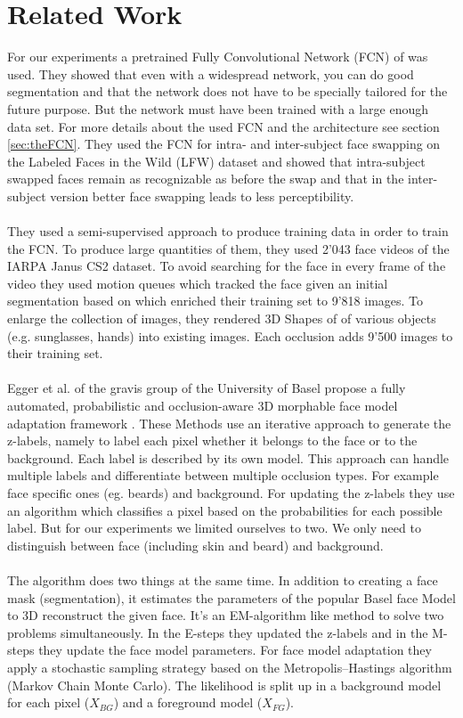 \section{Related Work}
For our experiments a pretrained Fully Convolutional Network (FCN) of \cite{nirkin2018_faceswap} was used. They showed that even with a widespread network, you can do good segmentation and that the network does not have to be specially tailored for the future purpose. But the network must have been trained with a large enough data set. For more details about the used FCN and the architecture see section \ref{sec:theFCN}. They used the FCN for intra- and inter-subject face swapping on the Labeled Faces in the Wild (LFW) dataset and showed that intra-subject swapped faces remain as recognizable as before the swap and that in the inter-subject version better face swapping  leads to less perceptibility.\\
\\
They used a semi-supervised approach to produce training data in order to train the FCN. To produce large quantities of them, they used 2'043 face videos of the IARPA Janus CS2 dataset. To avoid searching for the face in every frame of the video they used motion queues which tracked the face given an initial segmentation based on \cite{grundmann} which enriched their training set to 9'818 images. To enlarge the collection of images, they rendered 3D Shapes of of various objects (e.g. sunglasses, hands) into existing images. Each occlusion adds 9'500 images to their training set.\\
\\
Egger et al. of the gravis group of the University of Basel propose a fully automated, probabilistic and occlusion-aware 3D morphable face model adaptation framework \cite{egger_paper}. These Methods use an iterative approach to generate the z-labels, namely to label each pixel whether it belongs to the face or to the background. Each label is described by its own model. This approach can handle multiple labels and differentiate between multiple occlusion types. For example face specific ones (eg. beards) and background. For updating the z-labels they use an algorithm which classifies a pixel based on the probabilities for each possible label.  But for our experiments we limited ourselves to two. We only need to distinguish between face (including skin and beard) and background.\\ 
\\
The algorithm does two things at the same time. In addition to creating a face mask (segmentation), it estimates the parameters of the popular Basel face Model to 3D reconstruct the given face. It's an EM-algorithm like method to solve two problems simultaneously. In the E-steps they updated the z-labels and in the M-steps they update the face model  parameters. For face model adaptation they apply a stochastic sampling strategy based on the Metropolis–Hastings algorithm (Markov Chain Monte Carlo). The likelihood is split up in a background model for each pixel ($X_{BG}$) and a foreground model ($X_{FG}$).
